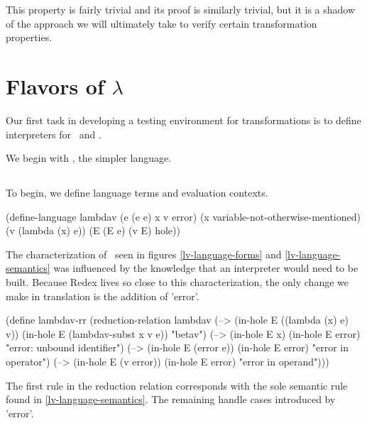 This property is fairly trivial and its proof is similarly trivial, but it is a shadow of 
the approach we will ultimately take to verify certain transformation properties.

\section{Flavors of $\lambda$}

Our first task in developing a testing environment for transformations is to define interpreters for \cm\ and \lv.

We begin with \lv, the simpler language.

\subsection{\lv}

To begin, we define language terms and evaluation contexts.

\begin{schemeblock}
\begin{schemedisplay}
(define-language lambdav
  (e (e e) x v error)
  (x variable-not-otherwise-mentioned)
  (v (lambda (x) e))
  (E (E e) (v E) hole))
\end{schemedisplay}
\end{schemeblock}

The characterization of \lv\ seen in figures \ref{lv-language-forms} and
\ref{lv-language-semantics} was influenced by the knowledge that an interpreter would need
to be built. Because Redex lives so close to this characterization, the only change we
make in translation is the addition of \scheme'error'.

\begin{schemeblock}
\begin{schemedisplay}
(define lambdav-rr
  (reduction-relation lambdav
   (--> (in-hole E ((lambda (x) e) v))
        (in-hole E (lambdav-subst x v e))
        "betav")
   (--> (in-hole E x)
        (in-hole E error)
        "error: unbound identifier")
   (--> (in-hole E (error e))
        (in-hole E error)
        "error in operator")
   (--> (in-hole E (v error))
        (in-hole E error)
        "error in operand")))
\end{schemedisplay}
\end{schemeblock}

The first rule in the reduction relation corresponds with the sole semantic rule found in \ref{lv-language-semantics}. The remaining handle cases introduced by \scheme'error'.

